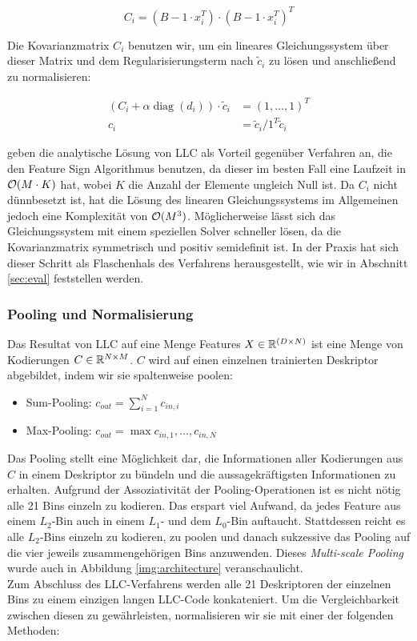 \begin{equation}
	C_i = (B - 1\cdot x_i^T)\cdot (B - 1\cdot x_i^T)^T
\end{equation}

Die Kovarianzmatrix $C_i$ benutzen wir, um ein lineares Gleichungssystem über dieser Matrix und dem Regularisierungsterm nach $\tilde{c}_i$ zu lösen und anschließend zu normalisieren:

\begin{align}
	(C_i + \alpha\mathop{diag}(d_i)) \cdot \tilde{c}_i &= (1, \dots, 1)^T \\
	c_i &= \tilde{c}_i / 1^T\tilde{c}_i
\end{align}

\cite{wyylhg10} geben die analytische Lösung von LLC als Vorteil gegenüber Verfahren an, die den Feature Sign Algorithmus benutzen, da dieser im besten Fall eine Laufzeit in $\mathcal{O}(M \cdot K)$ hat, wobei $K$ die Anzahl der Elemente ungleich Null ist. Da $C_i$ nicht dünnbesetzt ist, hat die Lösung des linearen Gleichungssystems im Allgemeinen jedoch eine Komplexität von $\mathcal{O}(M^3)$. Möglicherweise lässt sich das Gleichungssystem mit einem speziellen Solver schneller lösen, da die Kovarianzmatrix symmetrisch und positiv semidefinit ist. In der Praxis hat sich dieser Schritt als Flaschenhals des Verfahrens herausgestellt, wie wir in Abschnitt \ref{sec:eval} feststellen werden.

\subsubsection{Pooling und Normalisierung}

Das Resultat von LLC auf eine Menge Features $X \in \mathbb{R}^{(D \times N)}$ ist eine Menge von Kodierungen $C \in \mathbb{R}^{N \times M}$. $C$ wird auf einen einzelnen trainierten Deskriptor abgebildet, indem wir sie spaltenweise poolen:

\begin{itemize}
	\item Sum-Pooling: $c_{out} = \sum_{i=1}^{N} c_{in, i}$
	\item Max-Pooling: $c_{out} = \max{c_{in, 1}, \dots, c_{in, N}}$
\end{itemize} 

Das Pooling stellt eine Möglichkeit dar, die Informationen aller Kodierungen aus $C$ in einem Deskriptor zu bündeln und die aussagekräftigsten Informationen zu erhalten. Aufgrund der Assoziativität der Pooling-Operationen ist es nicht nötig alle 21 Bins einzeln zu kodieren. Das erspart viel Aufwand, da jedes Feature aus einem $L_2$-Bin auch in einem $L_1$- und dem $L_0$-Bin auftaucht. Stattdessen reicht es alle $L_2$-Bins einzeln zu kodieren, zu poolen und danach sukzessive das Pooling auf die vier jeweils zusammengehörigen Bins anzuwenden. Dieses \emph{Multi-scale Pooling} wurde auch in Abbildung \ref{img:architecture} veranschaulicht. \\
Zum Abschluss des LLC-Verfahrens werden alle 21 Deskriptoren der einzelnen Bins zu einem einzigen langen LLC-Code konkateniert. Um die Vergleichbarkeit zwischen diesen zu gewährleisten, normalisieren wir sie mit einer der folgenden Methoden:

